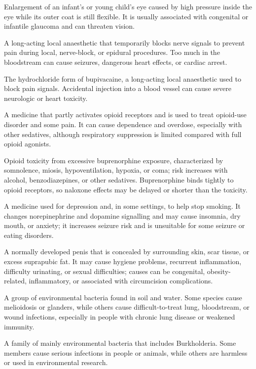  Enlargement of an infant's or young child's eye caused by high pressure inside the eye while its outer coat is still flexible. It is usually associated with congenital or infantile glaucoma and can threaten vision.

 A long-acting local anaesthetic that temporarily blocks nerve signals to prevent pain during local, nerve-block, or epidural procedures. Too much in the bloodstream can cause seizures, dangerous heart effects, or cardiac arrest.

 The hydrochloride form of bupivacaine, a long-acting local anaesthetic used to block pain signals. Accidental injection into a blood vessel can cause severe neurologic or heart toxicity.

 A medicine that partly activates opioid receptors and is used to treat opioid-use disorder and some pain. It can cause dependence and overdose, especially with other sedatives, although respiratory suppression is limited compared with full opioid agonists.

 Opioid toxicity from excessive buprenorphine exposure, characterized by somnolence, miosis, hypoventilation, hypoxia, or coma; risk increases with alcohol, benzodiazepines, or other sedatives. Buprenorphine binds tightly to opioid receptors, so naloxone effects may be delayed or shorter than the toxicity.

 A medicine used for depression and, in some settings, to help stop smoking. It changes norepinephrine and dopamine signalling and may cause insomnia, dry mouth, or anxiety; it increases seizure risk and is unsuitable for some seizure or eating disorders.

 A normally developed penis that is concealed by surrounding skin, scar tissue, or excess suprapubic fat. It may cause hygiene problems, recurrent inflammation, difficulty urinating, or sexual difficulties; causes can be congenital, obesity-related, inflammatory, or associated with circumcision complications.

 A group of environmental bacteria found in soil and water. Some species cause melioidosis or glanders, while others cause difficult-to-treat lung, bloodstream, or wound infections, especially in people with chronic lung disease or weakened immunity.

 A family of mainly environmental bacteria that includes Burkholderia. Some members cause serious infections in people or animals, while others are harmless or used in environmental research.


